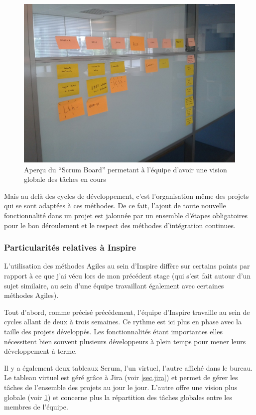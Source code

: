 \documentclass[12pt,a4paper]{book}
\begin{document}
\begin{figure}[htp]
\centering
\includegraphics[scale=.40]{img/agile1.jpg}
 \caption{Aperçu du ``Scrum Board'' permetant à l'équipe d'avoir une vision globale des tâches en cours}
 \label{fig.agile1}
\end{figure}

Mais au delà des cycles de développement, c'est l'organisation même des projets qui se sont adaptées à ces méthodes. De ce fait, l'ajout de toute nouvelle fonctionnalité dans un projet est jalonnée par un ensemble d'étapes obligatoires pour le bon déroulement et le respect des méthodes d'intégration continues.

\subsubsection{Particularités relatives à Inspire}

L'utilisation des méthodes Agiles au sein d'Inspire diffère sur certains points par rapport à ce que j'ai vécu lors de mon précédent stage (qui s'est fait autour d'un sujet similaire, au sein d'une équipe travaillant également avec certaines méthodes Agiles).

Tout d'abord, comme précisé précédement, l'équipe d'Inspire travaille au sein de cycles allant de deux à trois semaines. Ce rythme est ici plus en phase avec la taille des projets développés. Les fonctionnalités étant importantes elles nécessitent bien souvent plusieurs développeurs à plein temps pour mener leurs développement à terme. 

Il y a également deux tableaux Scrum, l'un virtuel, l'autre affiché dans le bureau. Le tableau virtuel est géré grâce à Jira (voir \cref{sec.jira}) et permet de gérer les tâches de l'ensemble des projets au jour le jour. L'autre offre une vision plus globale (voir \cref{fig.agile1}) et concerne plus la répartition des tâches globales entre les membres de l'équipe.
\end{document}
